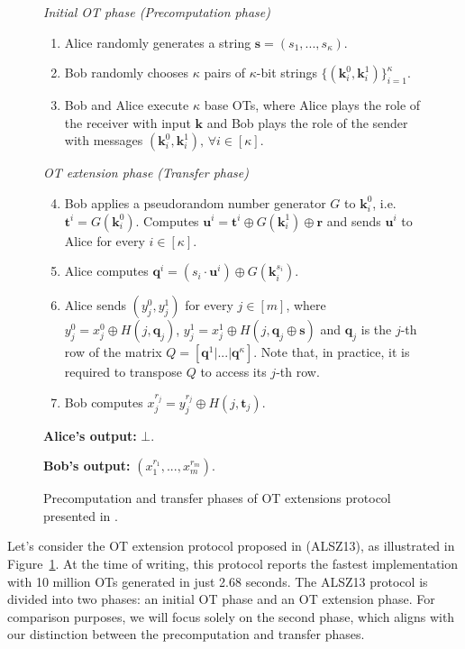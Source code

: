 \begin{figure}[t]
\begin{tcolorbox}
			\textit{Initial OT phase (Precomputation phase)}
    \begin{enumerate}
         \item Alice randomly generates a string $\bm{s} = (s_1, ..., s_\kappa)$.
         \item Bob randomly chooses $\kappa$ pairs of $\kappa$-bit strings $\{(\bm{k}^0_i, \bm{k}^1_i)\}^\kappa_{i=1}$.
         \item Bob and Alice execute $\kappa$ base OTs, where Alice plays the role of the receiver with input $\bm{k}$ and Bob plays the role of the sender with messages $(\bm{k}^0_i, \bm{k}^1_i),\, \forall i\in[\kappa]$.
    \end{enumerate}
    \textit{OT extension phase (Transfer phase)}
    \begin{enumerate}
    \setcounter{enumi}{3}
        \item Bob applies a pseudorandom number generator $G$ to $\bm{k}^0_i$, i.e. $\bm{t}^i = G(\bm{k}^0_i)$. Computes $\bm{u}^i = \bm{t}^i \oplus G(\bm{k}^1_i) \oplus \bm{r}$ and sends $\bm{u}^i$ to Alice for every $ i\in[\kappa]$.
        \item Alice computes $\bm{q}^i = (s_i \cdot \bm{u}^i) \oplus G(\bm{k}^{s_i}_i)$.
        \item Alice sends $(y^0_j, y^1_j)$ for every $j\in[m]$, where $y^0_j = x^0_j\oplus H(j,\bm{q}_j)$, $y^1_j = x^1_j\oplus H(j,\bm{q}_j\oplus \bm{s})$ and $\bm{q}_j$ is the $j$-th row of the matrix $Q = [ \bm{q}^1 | ...| \bm{q}^\kappa]$. Note that, in practice, it is required to transpose $Q$ to access its $j$-th row.
        \item Bob computes $x^{r_j}_j = y^{r_j}_j \oplus H(j, \bm{t}_j)$.
    \end{enumerate} 
    
				\textbf{Alice's output:} $\bot$.
    
				\textbf{Bob's output:} $(x^{r_1}_1, ..., x^{r_m}_m)$.

        
        \end{tcolorbox}
    \caption{Precomputation and transfer phases of OT extensions protocol presented in \cite{ALSZ13}.}
    \label{fig:ALSZ13Protocol}
\end{figure}

Let's consider the OT extension protocol proposed in \cite{ALSZ13} (ALSZ13), as illustrated in Figure~\ref{fig:ALSZ13Protocol}. At the time of writing, this protocol reports the fastest implementation with 10 million OTs generated in just 2.68 seconds. The ALSZ13 protocol is divided into two phases: an initial OT phase and an OT extension phase. For comparison purposes, we will focus solely on the second phase, which aligns with our distinction between the precomputation and transfer phases.

